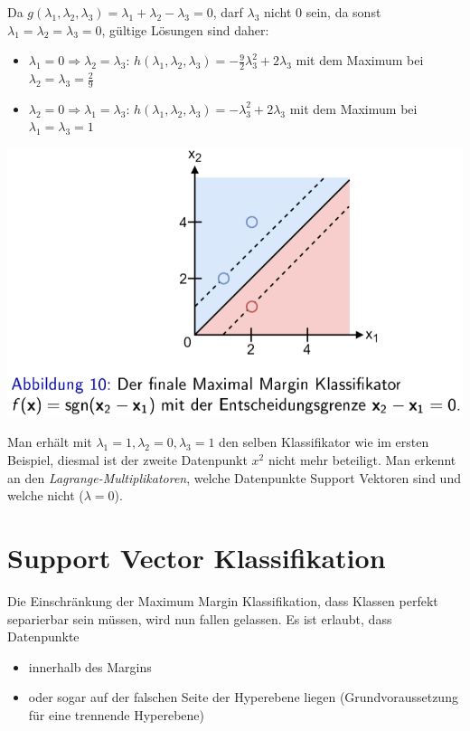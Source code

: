 \documentclass{report}
\begin{document}
  Da $g(\lambda_1, \lambda_2, \lambda_3) = \lambda_1 + \lambda_2 - \lambda_3 = 0$, darf $\lambda_3$ nicht $0$ sein, da sonst	
  $\lambda_1 = \lambda_2 = \lambda_3 = 0$, gültige Lösungen sind daher:\\	
  \vspace*{-1.5em}	
  \begin{itemize}	
    \item $\lambda_1 = 0 \Rightarrow \lambda_2 = \lambda_3$: $h(\lambda_1, \lambda_2, \lambda_3) = -\frac{9}{2}\lambda_3^2 + 2\lambda_3$	
    mit dem Maximum bei $\lambda_2 = \lambda_3 = \frac{2}{9}$	
    \item $\lambda_2 = 0 \Rightarrow \lambda_1 = \lambda_3$: $h(\lambda_1, \lambda_2, \lambda_3) = -\lambda_3^2 + 2\lambda_3$	
    mit dem Maximum bei $\lambda_1 = \lambda_3 = 1$	
  \end{itemize}	
  
  \begin{center}	
    \includegraphics[scale=.275]{ml06_10}	
  \end{center}	
  
  Man erhält mit $\lambda_1 =1, \lambda_2=0, \lambda_3=1$ den selben Klassifikator wie im ersten Beispiel, diesmal ist	
  der zweite Datenpunkt $x^2$ nicht mehr beteiligt. Man erkennt an den \textit{Lagrange-Multiplikatoren}, welche	
  Datenpunkte Support Vektoren sind und welche nicht ($\lambda = 0$).	
  
  \section{Support Vector Klassifikation}	
  
  Die Einschränkung der Maximum Margin Klassifikation, dass Klassen perfekt separierbar sein müssen, wird nun fallen gelassen.	
  Es ist erlaubt, dass Datenpunkte\\	
  \vspace*{-1.5em}	
  \begin{itemize}	
    \item innerhalb des Margins	
    \item oder sogar auf der falschen Seite der Hyperebene liegen (Grundvoraussetzung für eine trennende Hyperebene)	
  \end{itemize}	
  
\end{document}
